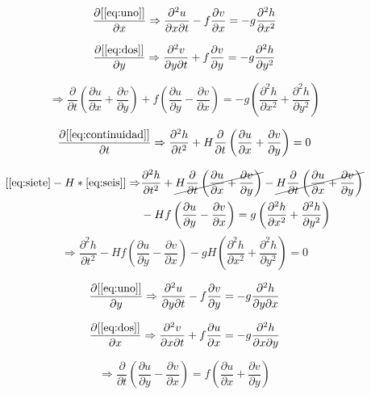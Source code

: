 \documentclass{article}
\newcommand\pder[2]{\ensuremath {\dfrac{\partial#1}{\partial#2}}}
\newcommand{\ppder}[2]{ \ensuremath {\dfrac{\partial^2 #1}{\partial #2^2}}}
\newcommand{\ppcder}[3]{ \ensuremath {\dfrac{\partial^2 #1}{\partial #2\partial #3}}}
\begin{document}
\begin{equation}
	\pder{[\eqref{eq:uno}]}{x} \Rightarrow
	\ppcder{u}{x}{t} - f\pder{v}{x} = -g \ppder{h}{x}
	\label{eq:cuatro}
\end{equation}

\begin{equation}
	\pder{[\eqref{eq:dos}]}{y} \Rightarrow
	\ppcder{v}{y}{t} + f\pder{v}{y} = -g \ppder{h}{y}
	\label{eq:cinco}
\end{equation}

\newcommand{\uymvx}{\left(\pder{u}{y}-\pder{v}{x}\right)}
\newcommand{\uxpvy}{\left(\pder{u}{x}+\pder{v}{y}\right)}
\newcommand{\hxphy}{\left(\ppder{h}{x}+\ppder{h}{y}\right)}

\begin{equation}
	[\eqref{eq:cuatro}+\eqref{eq:cinco}] \Rightarrow
	\pder{}{t}\left(\pder{u}{x}+\pder{v}{y}\right) + f\uymvx = -g \hxphy
	\label{eq:seis}
\end{equation}

\begin{equation}
	\pder{[\eqref{eq:continuidad}]}{t} \Rightarrow
	\ppder{h}{t} + H\pder{}{t}\left(\pder{u}{x}+\pder{v}{y}\right) = 0
	\label{eq:siete}
\end{equation}

\begin{equation}
    \begin{split}
	[\eqref{eq:siete}-H*\eqref{eq:seis}] \Rightarrow &
	\ppder{h}{t} + \cancel{H\pder{}{t}\uxpvy} -
	\cancel{H\pder{}{t}\uxpvy} \\
	& - Hf\left(\pder{u}{y}-\pder{v}{x}\right) = g \hxphy
    \end{split}
    \nonumber
\end{equation}
\begin{equation}
    \Rightarrow \ppder{h}{t} - Hf\uymvx
	 -gH \hxphy = 0
    \label{eq:ocho}
\end{equation}

\begin{equation}
	\pder{[\eqref{eq:uno}]}{y} \Rightarrow
	\ppcder{u}{y}{t} - f\pder{v}{y} = -g \ppcder{h}{y}{x}
	\label{eq:nueve}
\end{equation}

\begin{equation}
	\pder{[\eqref{eq:dos}]}{x} \Rightarrow
	\ppcder{v}{x}{t} + f\pder{u}{x} = -g \ppcder{h}{x}{y}
	\label{eq:diez}
\end{equation}

\begin{equation}
	[\eqref{eq:nueve}+\eqref{eq:diez}] \Rightarrow
	\pder{}{t} \uymvx = f \uxpvy
	\label{eq:once}
\end{equation}
\end{document}
